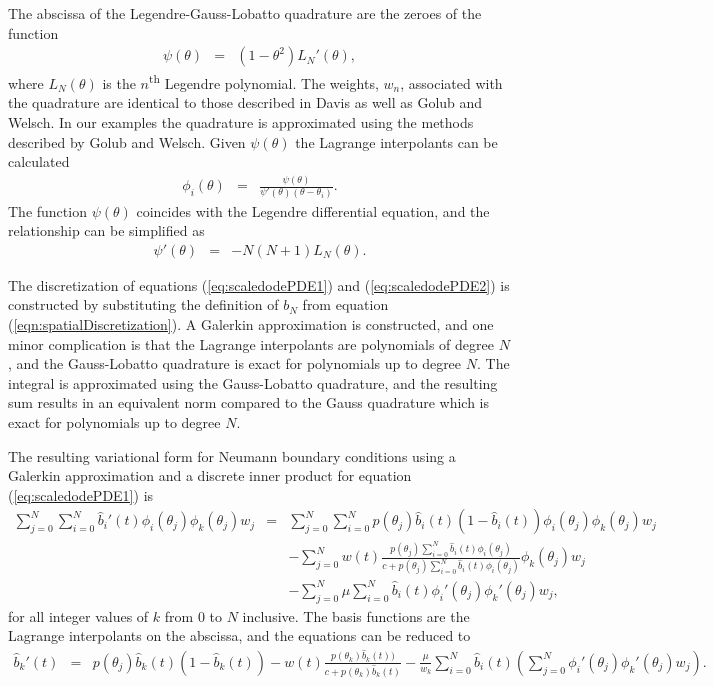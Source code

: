 \documentclass[review]{elsarticle}
\begin{document}
The abscissa of the Legendre-Gauss-Lobatto quadrature are the zeroes
of the function
\begin{eqnarray}
  \psi(\theta) & = & \left(1-\theta^2\right) L_{N}'(\theta),
\end{eqnarray}
where $L_N(\theta)$ is the $n$\textsuperscript{th} Legendre
polynomial\cite{davis2007methods}.  The weights, $w_n$, associated
with the quadrature are identical to those described in
Davis\cite{davis2007methods} as well as Golub and
Welsch\cite{gaussQuadratureRules}. In our examples the quadrature is
approximated using the methods described by Golub and
Welsch\cite{gaussQuadratureRules}.  Given $\psi(\theta)$ the Lagrange
interpolants can be calculated
\begin{eqnarray}
  \phi_i(\theta) & = & \frac{\psi(\theta)}{\psi'(\theta)(\theta-\theta_i)}.
\end{eqnarray}
The function $\psi(\theta)$ coincides with the Legendre differential
equation, and the relationship can be simplified as
\begin{eqnarray}
  \psi'(\theta) & = & -N(N+1)L_N(\theta).
\end{eqnarray}

The discretization of equations (\ref{eq:scaledodePDE1}) and
(\ref{eq:scaledodePDE2}) is constructed by substituting the definition
of $b_N$ from equation (\ref{eqn:spatialDiscretization}). A Galerkin
approximation is constructed, and one minor complication is that the
Lagrange interpolants are polynomials of degree $N$, and the
Gauss-Lobatto quadrature is exact for polynomials up to degree
$N$. The integral is approximated using the Gauss-Lobatto quadrature,
and the resulting sum results in an equivalent norm compared to the
Gauss quadrature which is exact for polynomials up to degree
$N$\cite{SobolevCanutoQuarteroni}.

The resulting variational form for Neumann boundary conditions using a
Galerkin approximation and a discrete inner product for equation
(\ref{eq:scaledodePDE1}) is
\begin{eqnarray}
  \sum_{j=0}^N \sum_{i=0}^N  \hat{b}_i'(t) \phi_i(\theta_j) \phi_k(\theta_j) w_j
  & = &
  \sum_{j=0}^N \sum_{i=0}^N p(\theta_j)  \hat{b}_i(t) (1 - \hat{b}_i(t) ) \phi_i(\theta_j) \phi_k(\theta_j) w_j \\
  & &  -  \sum_{j=0}^N w(t) \frac{p(\theta_j) \sum_{i=0}^N \hat{b}_i(t) \phi_i(\theta_j) }{c+p(\theta_j) \sum_{i=0}^N \hat{b}_i(t) \phi_i(\theta_j)} \phi_k(\theta_j) w_j \nonumber \\ 
  & & - \sum_{j=0}^N \mu  \sum_{i=0}^N \hat{b}_i(t) \phi_i'(\theta_j) \phi_k'(\theta_j)  w_j, \nonumber
\end{eqnarray}
for all integer values of $k$ from $0$ to $N$ inclusive.  The basis
functions are the Lagrange interpolants on the abscissa, and the
equations can be reduced to
\begin{eqnarray}
  \hat{b}_k'(t) 
  & = &
        p(\theta_j) \hat{b}_k(t) (1 - \hat{b}_k(t) )
        -  w(t) \frac{p(\theta_k) \hat{b}_k(t)) }{c+p(\theta_k)  \hat{b}_k(t) }  
   - \frac{\mu}{w_k} \sum_{i=0}^N \hat{b}_i(t) \left( \sum_{j=0}^N  \phi_i'(\theta_j) \phi_k'(\theta_j)  w_j \right).
\end{eqnarray}
\end{document}
